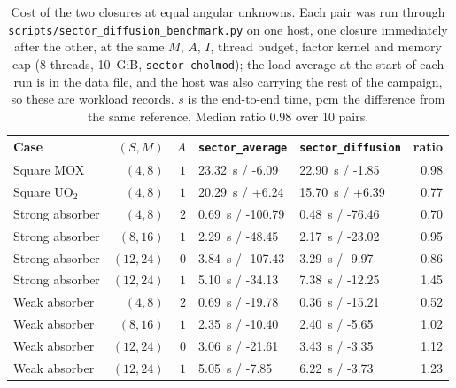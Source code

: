 \begin{table}[htbp]
\centering
\caption{Cost of the two closures at equal angular unknowns.  Each pair was run
through \texttt{scripts/sector\_diffusion\_benchmark.py} on one host, one closure
immediately after the other, at the same $M$, $A$, $I$, thread budget, factor kernel
and memory cap (8 threads, 10~GiB,
\texttt{sector-cholmod}); the load average at the start of each run is in the data
file, and the host was also carrying the rest of the campaign, so these are workload
records.  $s$ is the end-to-end time, pcm the difference from the same reference.
Median ratio 0.98 over 10 pairs.}
\label{tab:study4-closure-cost}
\centering\small
\begin{tabular}{l r r l l r}
\hline
Case & $(S,M)$ & $A$ & \texttt{sector\_average} & \texttt{sector\_diffusion} & ratio \\
\hline
Square MOX & $(4,8)$ & $1$ & 23.32~s / -6.09 & 22.90~s / -1.85 & 0.98\\
Square UO$_2$ & $(4,8)$ & $1$ & 20.29~s / +6.24 & 15.70~s / +6.39 & 0.77\\
Strong absorber & $(4,8)$ & $2$ & 0.69~s / -100.79 & 0.48~s / -76.46 & 0.70\\
Strong absorber & $(8,16)$ & $1$ & 2.29~s / -48.45 & 2.17~s / -23.02 & 0.95\\
Strong absorber & $(12,24)$ & $0$ & 3.84~s / -107.43 & 3.29~s / -9.97 & 0.86\\
Strong absorber & $(12,24)$ & $1$ & 5.10~s / -34.13 & 7.38~s / -12.25 & 1.45\\
Weak absorber & $(4,8)$ & $2$ & 0.69~s / -19.78 & 0.36~s / -15.21 & 0.52\\
Weak absorber & $(8,16)$ & $1$ & 2.35~s / -10.40 & 2.40~s / -5.65 & 1.02\\
Weak absorber & $(12,24)$ & $0$ & 3.06~s / -21.61 & 3.43~s / -3.35 & 1.12\\
Weak absorber & $(12,24)$ & $1$ & 5.05~s / -7.85 & 6.22~s / -3.73 & 1.23\\
\hline
\end{tabular}
\end{table}
